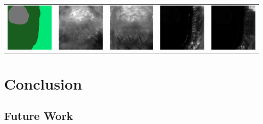\documentclass[twocolumn]{article}
\begin{document}
\begin{table}[t]
\begin{tabular}{c|c|c|c|c}
 				\includegraphics[width=0.25\columnwidth]{90.png} & \includegraphics[width=0.25\columnwidth]{91.png} & \includegraphics[width=0.25\columnwidth]{92.png} & \includegraphics[width=0.25\columnwidth]{93.png} & \includegraphics[width=0.25\columnwidth]{94.png} \\

		\end{tabular}
	\end{table}

	\section{Conclusion}
	
	
	\subsection{Future Work}

	
		
  
\end{document}
